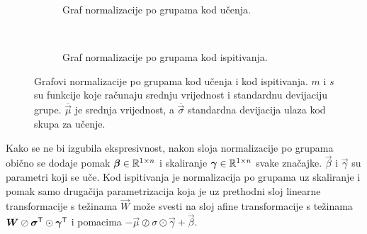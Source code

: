 \documentclass[utf8, diplomski, lmodern]{fer}
\begin{document}
\begin{figure}
	\centering
	\begin{subfigure}[t]{0.48\textwidth}
		\centering
		\caption{Graf normalizacije po grupama kod učenja.}
		\label{subfig:bn-ucenje}
	\end{subfigure}
	~
	\begin{subfigure}[t]{0.48\textwidth}
		\centering
		\caption{Graf normalizacije po grupama kod ispitivanja.}
		\label{subfig:bn-ispitivanje}
	\end{subfigure}
	\caption{Grafovi normalizacije po grupama kod učenja i kod ispitivanja. $m$ i $s$ su funkcije koje računaju srednju vrijednost i standardnu devijaciju grupe. $\overline{\vec\mu}$ je srednja vrijednost, a $\overline{\vec\sigma}$ standardna devijacija ulaza kod skupa za učenje.}
	\label{fig:bn-graf}
\end{figure}

Kako se ne bi izgubila ekspresivnost, nakon sloja normalizacije po grupama obično se dodaje pomak $\vec\beta\in\R^{1\times n}$ i skaliranje $\vec\gamma\in\R^{1\times n}$ svake značajke. $\vec\beta$ i $\vec\gamma$ su parametri koji se uče. Kod ispitivanja je normalizacija po grupama uz skaliranje i pomak samo drugačija parametrizacija koja je uz prethodni sloj linearne transformacije s težinama $\vec W$ može svesti na sloj afine transformacije s težinama $\vec W\oslash\vec\sigma^\tp\odot\vec\gamma^\tp$ i pomacima $-\vec\mu\oslash\sigma\odot\vec\gamma+\vec\beta$.
\end{document}
